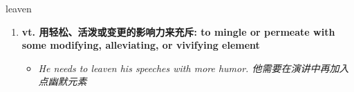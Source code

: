 
\begin{frame}
{\huge leaven}
\begin{center}
\begin{enumerate}\Large
  \item \textbf{vt. 用轻松、活泼或变更的影响力来充斥: to mingle or permeate with some modifying, alleviating, or vivifying element}
  \begin{itemize}
    \item \em{\Large{He needs to leaven his speeches with more humor. 他需要在演讲中再加入点幽默元素}}
  \end{itemize}
\end{enumerate}
\end{center}
\end{frame}

